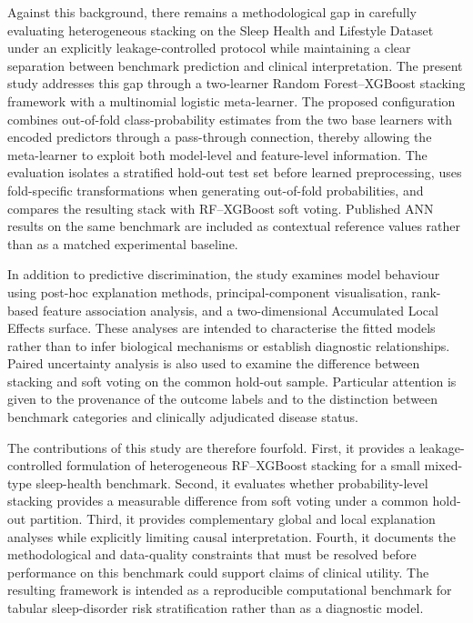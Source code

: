 \documentclass[a4paper,fleqn]{cas-dc}
\begin{document}
Against this background, there remains a methodological gap in carefully evaluating heterogeneous stacking on the Sleep Health and Lifestyle Dataset under an explicitly leakage-controlled protocol while maintaining a clear separation between benchmark prediction and clinical interpretation. The present study addresses this gap through a two-learner Random Forest--XGBoost stacking framework with a multinomial logistic meta-learner. The proposed configuration combines out-of-fold class-probability estimates from the two base learners with encoded predictors through a pass-through connection, thereby allowing the meta-learner to exploit both model-level and feature-level information. The evaluation isolates a stratified hold-out test set before learned preprocessing, uses fold-specific transformations when generating out-of-fold probabilities, and compares the resulting stack with RF--XGBoost soft voting. Published ANN results on the same benchmark are included as contextual reference values rather than as a matched experimental baseline.

In addition to predictive discrimination, the study examines model behaviour using post-hoc explanation methods, principal-component visualisation, rank-based feature association analysis, and a two-dimensional Accumulated Local Effects surface. These analyses are intended to characterise the fitted models rather than to infer biological mechanisms or establish diagnostic relationships. Paired uncertainty analysis is also used to examine the difference between stacking and soft voting on the common hold-out sample. Particular attention is given to the provenance of the outcome labels and to the distinction between benchmark categories and clinically adjudicated disease status.

The contributions of this study are therefore fourfold. First, it provides a leakage-controlled formulation of heterogeneous RF--XGBoost stacking for a small mixed-type sleep-health benchmark. Second, it evaluates whether probability-level stacking provides a measurable difference from soft voting under a common hold-out partition. Third, it provides complementary global and local explanation analyses while explicitly limiting causal interpretation. Fourth, it documents the methodological and data-quality constraints that must be resolved before performance on this benchmark could support claims of clinical utility. The resulting framework is intended as a reproducible computational benchmark for tabular sleep-disorder risk stratification rather than as a diagnostic model.
\end{document}
